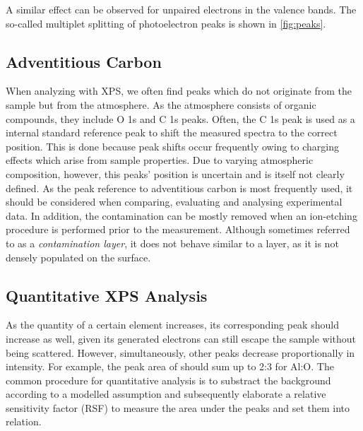 A similar effect can be observed for unpaired electrons in the valence bands. The so-called multiplet splitting of photoelectron peaks is shown in \ref{fig:peaks}.



\subsection{Adventitious Carbon}
    
When analyzing with XPS, we often find peaks which do not originate from the sample but from the atmosphere. As the atmosphere consists of organic compounds, they include O 1s and C 1s peaks. Often, the C 1s peak is used as a internal standard reference peak to shift the measured spectra to the correct position. This is done because peak shifts occur frequently owing to charging effects which arise from sample properties. Due to varying atmospheric composition, however, this peaks' position is uncertain and is itself  not clearly defined. \cite{biesinger_accessing_2022} As the peak reference to adventitious carbon is most frequently used, it should be considered when comparing, evaluating and analysing experimental data.
In addition, the contamination can be mostly removed when an ion-etching procedure is performed prior to the measurement. Although sometimes referred to as a \emph{contamination layer}, it does not behave similar to a layer, as it is not densely populated on the surface.

\subsection{Quantitative XPS Analysis}
As the quantity of a certain element increases, its corresponding peak should increase as well, given its generated electrons can still escape the sample without being scattered. However, simultaneously, other peaks decrease proportionally in intensity. For example, the peak area of  should sum up to 2:3 for Al:O.
The common procedure for quantitative analysis is to substract the background according to a modelled assumption and subsequently elaborate a relative sensitivity factor (RSF) to measure the area under the peaks and set them into relation.

